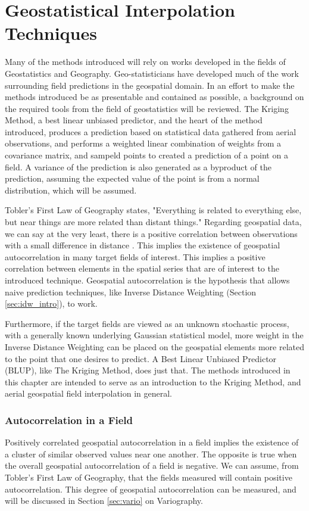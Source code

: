 \chapter{Geostatistical Interpolation Techniques}
Many of the methods introduced will rely on works developed in the fields of Geostatistics and Geography. Geo-statisticians have developed much of the work surrounding field predictions in the geospatial domain. In an effort to make the methods introduced be as presentable and contained as possible, a background on the required tools from the field of geostatistics will be reviewed. The Kriging Method, a best linear unbiased predictor, and the heart of the method introduced, produces a prediction based on statistical data gathered from aerial observations, and performs a weighted linear combination of weights from a covariance matrix, and sampeld points to created a prediction of a point on a field. A variance of the prediction is also generated as a byproduct of the prediction, assuming the expected value of the point is from a normal distribution, which will be assumed. 

Tobler's First Law of Geography \cite{tobler:first_law} states, "Everything is related to everything else, but near things are more related than distant things." Regarding geospatial data, we can say at the very least, there is a positive correlation between observations with a small difference in distance \cite{miller:on_toblers_first_law}. This implies the existence of geospatial autocorrelation in many target fields of interest. This implies a positive correlation between elements in the spatial series that are of interest to the introduced technique. Geospatial autocorrelation is the hypothesis that allows naive prediction techniques, like Inverse Distance Weighting (Section \ref{sec:idw_intro}), to work. 

Furthermore, if the target fields are viewed as an unknown stochastic process, with a generally known underlying Gaussian statistical model, more weight in the Inverse Distance Weighting can be placed on the geospatial elements more related to the point that one desires to predict. A Best Linear Unbiased Predictor (BLUP), like The Kriging Method, does just that. The methods introduced in this chapter are intended to serve as an introduction to the Kriging Method, and aerial geospatial field interpolation in general.

\subsection{Autocorrelation in a Field}
Positively correlated geospatial autocorrelation in a field implies the existence of a cluster of similar observed values near one another. The opposite is true when the overall geospatial autocorrelation of a field is negative. We can assume, from Tobler's First Law of Geography, that the fields measured will contain positive autocorrelation. This degree of geospatial autocorrelation can be measured, and will be discussed in Section \ref{sec:vario} on Variography.


